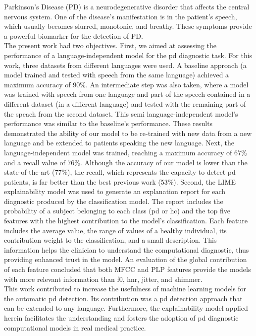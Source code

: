 Parkinson’s Disease (PD) is a neurodegenerative disorder that affects the central nervous system. One of the disease's manifestation is in the patient’s speech, which usually becomes slurred, monotonic, and breathy. These symptoms provide a powerful biomarker for the detection of PD. \\
The present work had two objectives. First, we aimed at assessing the performance of a language-independent model for the \gls{pd} diagnostic task. For this work, three datasets from different languages were used. A baseline approach (a model trained and tested with speech from the same language) achieved a maximum accuracy of 90\%. An intermediate step was also taken, where a model was trained with speech from one language and part of the speech contained in a different dataset (in a different language) and tested with the remaining part of the speach from the second dataset. This semi language-independent model's performance was similar to the baseline's performance. These results demonstrated the ability of our model to be re-trained with new data from a new language and be extended to patients speaking the new language. Next, the language-independent model was trained, reaching a maximum accuracy of 67\% and a recall value of 76\%. Although the accuracy of our model is lower than the state-of-the-art (77\%), the recall, which represents the capacity to detect \gls{pd} patients, is far better than the best previous work (53\%). Second, the LIME explainability model was used to generate an explanation report for each diagnostic produced by the classification model. The report includes the probability of a subject belonging to each class (\gls{pd} or \gls{hc}) and the top five features with the highest contribution to the model's classification. Each feature includes the average value, the range of values of a healthy individual, its contribution weight to the classification, and a small description. This information helps the clinician to understand the computational diagnostic, thus providing enhanced trust in the model. An evaluation of the global contribution of each feature concluded that both MFCC and PLP features provide the models with more relevant information than \gls{f0}, \gls{hnr}, jitter, and shimmer.\\
This work contributed to increase the usefulness of machine learning models for the automatic \gls{pd} detection. Its contribution was a \gls{pd} detection approach that can be extended to any language. Furthermore, the explainability model applied herein facilitates the understanding and fosters the adoption of \gls{pd} diagnostic computational models in real medical practice.

